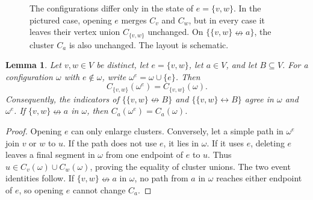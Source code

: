 \documentclass[11pt]{article}
\newtheorem{lemma}[theorem]{Lemma}
\theoremstyle{definition}
\theoremstyle{remark}
\newcommand{\con}{\leftrightarrow}
\newcommand{\ncon}{\nleftrightarrow}
\begin{document}
\begin{figure}[htbp]
\centering
{}
\caption{The configurations differ only in the state of $e=\{v,w\}$. In the pictured
case, opening $e$ merges $C_v$ and $C_w$, but in every case it leaves their vertex union
$C_{\{v,w\}}$ unchanged. On $\{\{v,w\}\ncon a\}$, the cluster $C_a$ is also unchanged.
The layout is schematic.}
\label{fig:force-edge}
\end{figure}

\begin{lemma}\label{lem:internal}
Let $v,w\in V$ be distinct, let $e=\{v,w\}$, let $a\in V$, and let $B\subseteq V$.
For a configuration $\omega$ with $e\notin\omega$, write $\omega^e=\omega\cup\{e\}$.
Then
\[
 C_{\{v,w\}}(\omega^e)=C_{\{v,w\}}(\omega).
\]
Consequently, the indicators of $\{\{v,w\}\ncon B\}$ and $\{\{v,w\}\con B\}$ agree in
$\omega$ and $\omega^e$. If $\{v,w\}\ncon a$ in $\omega$, then
$C_a(\omega^e)=C_a(\omega)$.
\end{lemma}

\begin{proof}
Opening $e$ can only enlarge clusters. Conversely, let a simple path in $\omega^e$ join
$v$ or $w$ to $u$. If the path does not use $e$, it lies in $\omega$. If it uses $e$,
deleting $e$ leaves a final segment in $\omega$ from one endpoint of $e$ to $u$. Thus
$u\in C_v(\omega)\cup C_w(\omega)$, proving the equality of cluster unions. The two event
identities follow. If $\{v,w\}\ncon a$ in $\omega$, no path from $a$ in $\omega$ reaches
either endpoint of $e$, so opening $e$ cannot change $C_a$.
\end{proof}
\end{document}
